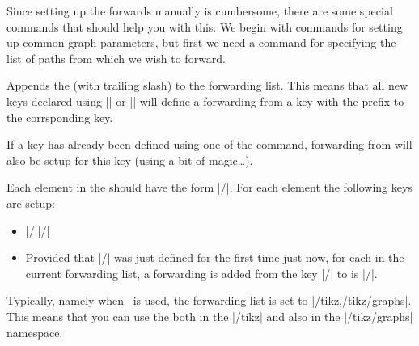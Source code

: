 Since setting up the forwards manually is cumbersome, there are some
special commands that should help you with this. We begin with
commands for setting up common graph parameters, but first we need a
command for specifying the list of paths from which we wish to
forward.

\begin{command}{\pgfgdappendtoforwardinglist{}}
  Appends the  (with trailing slash) to the forwarding
  list. This means that all new keys declared using
  |\pgfgddeclareforwardedkeys| or |\pgfgddeclarealgorithmkey| will
  define a forwarding from a key with the prefix  to the
  corrsponding key. 

  If a key has already been defined using one of the command,
  forwarding from  will also 
  be setup for this key (using a bit of magic\ldots).  
\end{command}


\begin{command}{\pgfgddeclareforwardedkeys{}}
  Each element in the  should have the
  form |/|. For each element the following
  keys are setup:

  \begin{itemize}
  \item {}|/||/|
  \item Provided that |/| was just defined
    for the first time just now, for each  in the current
    forwarding list, a forwarding is added from the key
    |/| to is |/|.
  \end{itemize}
  Typically, namely when \tikzname\ is used, the forwarding list is
  set to |/tikz,/tikz/graphs|. This means that you can use the
   both in the |/tikz| and also in the |/tikz/graphs|
  namespace.
\begin{codeexample}
\end{codeexample}
\end{command}


